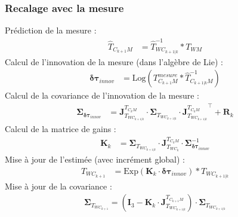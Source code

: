 \documentclass[a4paper]{article}
\begin{document}
\subsubsection{Recalage avec la mesure}

\noindent Prédiction de la mesure :
\begin{align}
\hat{T}_{C_{k+1}M} &= \hat{T}_{WC_{k+1|k}}^{-1} \ast T_{WM}
\end{align}
Calcul de l'innovation de la mesure (dans l'algèbre de Lie) :
\begin{align}
\bm{\delta\tau}_{innov} &= \text{Log}(T_{C_{k+1}M}^{mesure} \ast \hat{T}_{C_{k+1|k}M}^{-1})
\end{align}
Calcul de la covariance de l'innovation de la mesure :
\begin{align}
\bm{\Sigma}_{\bm{\delta\tau}_{innov}} &= \bm{J}^{T_{C_kM}}_{T_{WC_{k+1|k}}} \cdot \bm{\Sigma}_{T_{WC_{k+1|k}}} \cdot 
{\bm{J}^{T_{C_kM}}_{T_{WC_{k+1|k}}}}^{\top} + \bm{R}_k
\end{align}
Calcul de la matrice de gains :
\begin{align}
\bm{K}_k &= \bm{\Sigma}_{T_{WC_{k+1|k}}} \cdot \bm{J}^{T_{C_kM}}_{T_{WC_k}} \cdot \bm{\Sigma}_{\bm{\delta\tau}_{innov}}^{-1}
\end{align}
Mise à jour de l'estimée (avec incrément global) :
\begin{align}
T_{WC_{k+1}} &= \text{Exp}(\bm{K}_k \cdot \bm{\delta\tau}_{innov}) \ast 
T_{WC_{k+1|k}}
\end{align}
Mise à jour de la covariance :
\begin{align}
\bm{\Sigma}_{T_{WC_{k+1}}} = \left( \bm{I}_3 - \bm{K}_k \cdot 
\bm{J}^{T_{C_{k+1}M}}_{T_{WC_{k+1|k}}} 
\right) \cdot \bm{\Sigma}_{T_{WC_{k+1|k}}}
\end{align}
\end{document}
